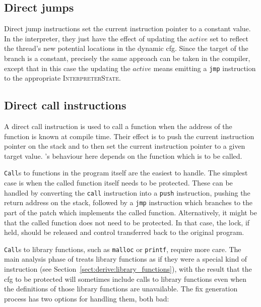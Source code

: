 \subsection{Direct jumps}

Direct jump instructions set the current instruction pointer to a
constant value.  In the interpreter, they just have the effect of
updating the $\mathit{active}$ set to reflect the thread's new
potential locations in the dynamic \gls{cfg}.  Since the target of the
branch is a constant, precisely the same approach can be taken in the
compiler, except that in this case the updating the $\mathit{active}$
means emitting a \texttt{jmp} instruction to the appropriate
\textsc{InterpreterState}.

\subsection{Direct call instructions}

A direct call instruction is used to call a function when the address
of the function is known at compile time.  Their effect is to push the
current instruction pointer on the stack and to then set the current
instruction pointer to a given target value.  {\Implementation}'s
behaviour here depends on the function which is to be called.

\texttt{Call}s to functions in the program itself are the easiest to
handle.  The simplest case is when the called function itself needs to
be protected.  These can be handled by converting the \texttt{call}
instruction into a \texttt{push} instruction, pushing the return
address on the stack, followed by a \texttt{jmp} instruction which
branches to the part of the patch which implements the called
function.  Alternatively, it might be that the called function does
not need to be protected.  In that case, the lock, if held, should be
released and control transferred back to the original program.

\texttt{Call}s to library functions, such as \texttt{malloc} or
\texttt{printf}, require more care.  The main analysis phase of
       {\technique} treats library functions as if they were a special
       kind of instruction (see
       Section~\ref{sect:derive:library_functions}), with the result
       that the \gls{cfg} to be protected will sometimes include calls
       to library functions even when the definitions of those library
       functions are unavailable.  The fix generation process has two
       options for handling them, both bad:

